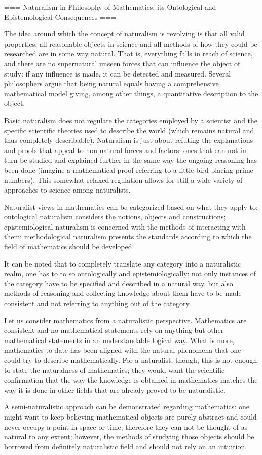=== Naturalism in Philosophy of Mathematics: its Ontological and Epistemological Consequences ===

The idea around which the concept of naturalism is revolving is that all valid properties, all reasonable objects in science and all methods of how they could be researched are in some way natural. That is, everything falls in reach of science, and there are no supernatural unseen forces that can influence the object of study: if any influence is made, it can be detected and measured. Several philosophers argue that being natural equals having a comprehensive mathematical model giving, among other things, a quantitative description to the object.

Basic naturalism does not regulate the categories employed by a scientist and the specific scientific theories used to describe the world (which remains natural and thus completely describable). Naturalism is just about refuting the explanations and proofs that appeal to non-natural forces and factors: ones that can not in turn be studied and explained further in the same way the ongoing reasoning has been done (imagine a mathematical proof referring to a little bird placing prime numbers). This somewhat relaxed regulation allows for still a wide variety of approaches to science among naturalists. 

Naturalist views in mathematics can be categorized based on what they apply to: ontological naturalism considers the notions, objects and constructions; epistemiological naturalism is concerned with the methods of interacting with them; methodological naturalism presents the standards according to which the field of mathematics should be developed.

It can be noted that to completely translate any category into a naturalistic realm, one has to to so ontologically and epistemiologically: not only instances of the category have to be specified and described in a natural way, but also methods of reasoning and collecting knowledge about them have to be made consistent and not referring to anything out of the category.

Let us consider mathematics from a naturalistic perspective. Mathematics are consistent and no mathematical statements rely on anything but other mathematical statements in an understandable logical way. What is more, mathematics to date has been aligned with the natural phenomena that one could try to describe mathematically. For a naturalist, though, this is not enough to state the naturalness of mathematics; they would want the scientific confirmation that the way the knowledge is obtained in mathematics matches the way it is done in other fields that are already proved to be naturalistic.

A semi-naturalistic approach can be demonstrated regarding mathematics: one might want to keep believing mathematical objects are purely abstract and could never occupy a point in space or time, therefore they can not be thought of as natural to any extent; however, the methods of studying those objects should be borrowed from definitely naturalistic field and should not rely on an intuition.








